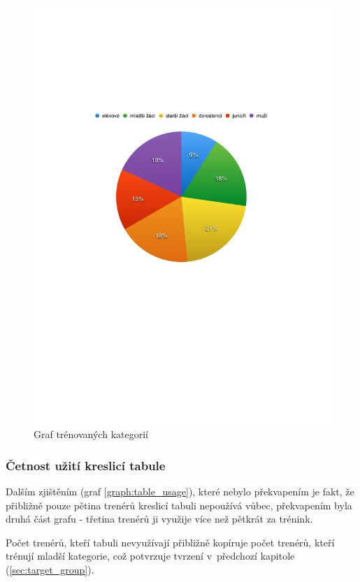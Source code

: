 \documentclass[thesis=B,czech]{FITthesis}[2012/06/26]
\begin{document}
	\begin{figure}[h!t]
		\centering
		\includegraphics{img/graph_category}
		\caption{Graf trénovaných kategorií}\label{graph:category}
	\end{figure}

\subsubsection{Četnost užití kreslicí tabule}

	Dalším zjištěním (graf \ref{graph:table_usage}), které nebylo překvapením je fakt, že přibližně pouze pětina trenérů kreslicí tabuli nepoužívá vůbec, překvapením byla druhá část grafu \-- třetina trenérů ji využije více než pětkrát za trénink.

	Počet trenérů, kteří tabuli nevyužívají přibližně kopíruje počet trenérů, kteří trénují mladší kategorie, což potvrzuje tvrzení v~předchozí kapitole (\ref{sec:target_group}).
\end{document}
